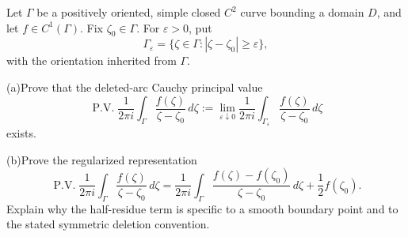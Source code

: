 \begin{problem}[CP-IV-0015]
\label{prob:cp-iv-0015}
Let $\Gamma$ be a positively oriented, simple closed $C^2$ curve bounding a domain $D$,
and let $f\in C^1(\Gamma)$. Fix $\zeta_0\in\Gamma$. For $\varepsilon>0$, put
\[
\Gamma_\varepsilon=\{\zeta\in\Gamma:|\zeta-\zeta_0|\ge\varepsilon\},
\]
with the orientation inherited from $\Gamma$.

\par\noindent (a)\quad Prove that the deleted-arc Cauchy principal value
\[
\operatorname{P.V.}\frac{1}{2\pi i}\int_\Gamma
\frac{f(\zeta)}{\zeta-\zeta_0}\,d\zeta
:=\lim_{\varepsilon\downarrow0}\frac1{2\pi i}
\int_{\Gamma_\varepsilon}\frac{f(\zeta)}{\zeta-\zeta_0}\,d\zeta
\]
exists.

\par\noindent (b)\quad Prove the regularized representation
\[
\operatorname{P.V.}\frac1{2\pi i}\int_\Gamma
\frac{f(\zeta)}{\zeta-\zeta_0}\,d\zeta
=\frac1{2\pi i}\int_\Gamma
\frac{f(\zeta)-f(\zeta_0)}{\zeta-\zeta_0}\,d\zeta
+\frac12 f(\zeta_0).
\]
Explain why the half-residue term is specific to a smooth boundary point
and to the stated symmetric deletion convention.
\end{problem}



